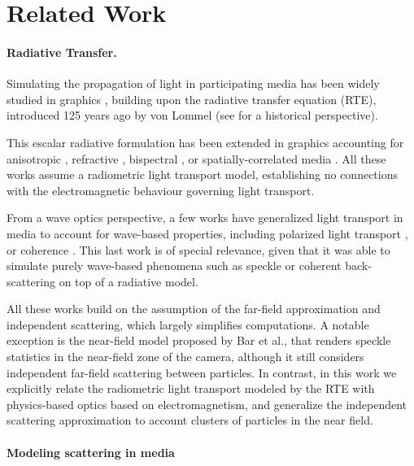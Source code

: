 \section{Related Work}
\label{sec:waveoptics:related}

\paragraph{Radiative Transfer. } 
Simulating the propagation of light in participating media has been widely studied in graphics \cite{novak2018monte}, building upon the radiative transfer equation (RTE), introduced 125 years ago by von Lommel \cite{lommel1889photometrie} (see \cite{mishchenko2013125} for a historical perspective). 

This escalar radiative formulation has been extended in graphics accounting for anisotropic \cite{jakob2010radiative}, refractive \cite{ament2014refractive}, bispectral \cite{gutierrez2008visualizing}, or spatially-correlated media \cite{jarabo2018radiative,bitterli2018radiative}. All these works assume a radiometric light transport model, establishing no connections with the electromagnetic behaviour governing light transport. 

From a wave optics perspective, a few works have generalized light transport in media to account for wave-based properties, including polarized light transport \cite{wilkie2001combined,Jarabo2018bidirectional}, or coherence \cite{bar2019monte}. This last work is of special relevance, given that it was able to simulate purely wave-based phenomena such as speckle or coherent back-scattering on top of a radiative model. 

All these works build on the assumption of the far-field approximation and independent scattering, which largely simplifies computations. A notable exception is the near-field model proposed by Bar et al.\cite{bar2020rendering}, that renders speckle statistics in the near-field zone of the camera, although it still considers independent far-field scattering between particles. In contrast, in this work we explicitly relate the radiometric light transport modeled by the RTE with physics-based optics based on electromagnetism, and generalize the independent scattering approximation to account clusters of particles in the near field. 


\paragraph{Modeling scattering in media}


